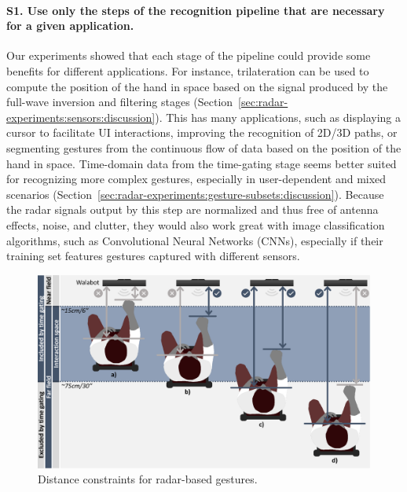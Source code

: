 


\paragraph{S1. Use only the steps of the recognition pipeline that are necessary for a given application.}
Our experiments showed that each stage of the pipeline could provide some benefits for different applications. 
%
For instance, trilateration can be used to compute the position of the hand in space based on the signal produced by the full-wave inversion and filtering stages (Section~\ref{sec:radar-experiments:sensors:discussion}). This has many applications, such as displaying a cursor to facilitate UI interactions, improving the recognition of 2D/3D paths, or segmenting gestures from the continuous flow of data based on the position of the hand in space.
%
Time-domain data from the time-gating stage seems better suited for recognizing more complex gestures, especially in user-dependent and mixed scenarios (Section~\ref{sec:radar-experiments:gesture-subsets:discussion}). 
Because the radar signals output by this step are normalized and thus free of antenna effects, noise, and clutter, they would also work great with image classification algorithms, such as Convolutional Neural Networks (CNNs), especially if their training set features gestures captured with different sensors.

\begin{figure}[bt]
    \centering
    \includegraphics[width=\linewidth]{Figures/RadarExperiments/Discussion/pipeline-limitations-range.pdf}
    \caption{Distance constraints for radar-based gestures.}
    \label{fig:radar-experiments:discussion:radar-range}
\end{figure}

